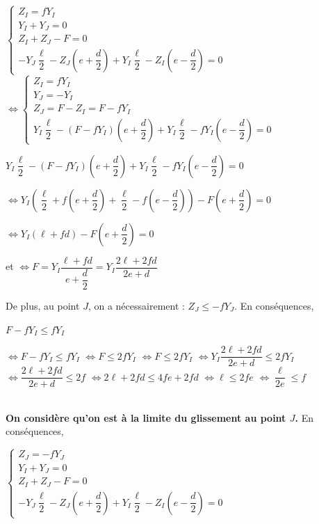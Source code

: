 \documentclass[10pt,fleqn]{article} %
\begin{document}
\begin{multicols}{2}
\begin{corrige}
$
\left\{
\begin{array}{l}
Z_I =  fY_I  \\
Y_I + Y_J = 0 \\
Z_I + Z_J -F = 0 \\ 
-Y_J \dfrac{\ell}{2}-Z_J \left(e+\dfrac{d}{2}\right) 
+Y_I \dfrac{\ell}{2}-Z_I \left(e-\dfrac{d}{2}\right) = 0
\end{array}
\right.$
$
\Leftrightarrow
\left\{
\begin{array}{l}
Z_I =  fY_I  \\
Y_J = -Y_I \\
Z_J=F-Z_I =F-fY_I  \\ 
Y_I \dfrac{\ell}{2}-\left( F-fY_I\right) \left(e+\dfrac{d}{2}\right) 
+Y_I \dfrac{\ell}{2}-fY_I \left(e-\dfrac{d}{2}\right) = 0
\end{array}
\right.$

$Y_I \dfrac{\ell}{2}-\left( F-fY_I\right) \left(e+\dfrac{d}{2}\right) 
+Y_I \dfrac{\ell}{2}-fY_I \left(e-\dfrac{d}{2}\right) = 0$

$\Leftrightarrow Y_I\left(  \dfrac{\ell}{2}+ f \left(e+\dfrac{d}{2}\right) 
+\dfrac{\ell}{2}-f \left(e-\dfrac{d}{2}\right)\right) - F\left(e+\dfrac{d}{2}\right) = 0$

$\Leftrightarrow Y_I\left(  \ell+fd \right) - F\left(e+\dfrac{d}{2}\right) = 0$
 
 et $\Leftrightarrow F = Y_I \dfrac{\ell+fd }{e+\dfrac{d}{2}}= Y_I \dfrac{2\ell+2fd }{2e+d}$

De plus, au point $J$, on a nécessairement : 
$Z_J\leq -fY_J $. En conséquences, 

$F-fY_I \leq fY_I $

$\Leftrightarrow F-fY_I \leq fY_I $
$\Leftrightarrow F \leq 2fY_I $
$\Leftrightarrow F \leq 2fY_I $
$\Leftrightarrow  Y_I \dfrac{2\ell+2fd }{2e+d}\leq 2fY_I $
$\Leftrightarrow  \dfrac{2\ell+2fd }{2e+d}\leq 2f$
$\Leftrightarrow  2\ell+2fd \leq 4f e+2fd $
$\Leftrightarrow  \ell \leq 2f e $
$\Leftrightarrow  \dfrac{\ell}{2e} \leq f $
\end{corrige}

\begin{corrige}~\\

\textbf{On considère qu'on est à la limite du glissement au point $J$.}
  En conséquences, 

$
\left\{
\begin{array}{l}
Z_J =  -fY_J \\
Y_I + Y_J = 0 \\
Z_I + Z_J -F = 0 \\ 
-Y_J \dfrac{\ell}{2}-Z_J \left(e+\dfrac{d}{2}\right) 
+Y_I \dfrac{\ell}{2}-Z_I \left(e-\dfrac{d}{2}\right) = 0
\end{array}
\right.$


\end{corrige}
\end{multicols}
\end{document}
